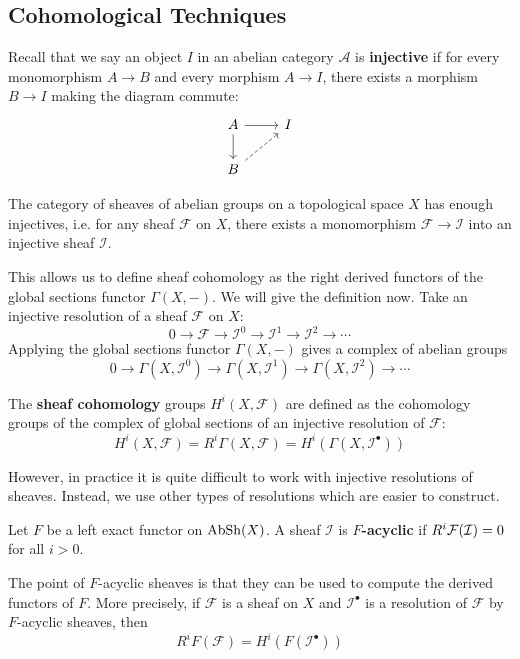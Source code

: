 \documentclass[12pt]{article}
\begin{document}
\subsection{Cohomological Techniques}
Recall that we say an object $I$ in an abelian category $\mathcal{A}$ is \textbf{injective} if for every monomorphism $A \to B$ and every morphism $A \to I$, there exists a morphism $B \to I$ making the diagram commute:
\[\begin{tikzcd}
        A \arrow[r] \arrow[d] & I \\
        B \arrow[ru, dashed] &
    \end{tikzcd}\]
\begin{theorem}
    The category of sheaves of abelian groups on a topological space $X$ has enough injectives, i.e. for any sheaf $\mathcal{F}$ on $X$, there exists a monomorphism $\mathcal{F} \to \mathcal{I}$ into an injective sheaf $\mathcal{I}$.
\end{theorem}

This allows us to define sheaf cohomology as the right derived functors of the global sections functor $\Gamma(X, -)$. We will give the definition now. Take an injective resolution of a sheaf $\mathcal{F}$ on $X$:
\[0 \to \mathcal{F} \to \mathcal{I}^0 \to \mathcal{I}^1 \to \mathcal{I}^2 \to \cdots\]
Applying the global sections functor $\Gamma(X, -)$ gives a complex of abelian groups
\[0 \to \Gamma(X, \mathcal{I}^0) \to \Gamma(X, \mathcal{I}^1) \to \Gamma(X, \mathcal{I}^2) \to \cdots\]

\begin{definition}
    The \textbf{sheaf cohomology} groups $H^i(X, \mathcal{F})$ are defined as the cohomology groups of the complex of global sections of an injective resolution of $\mathcal{F}$:
    \[H^i(X, \mathcal{F}) = R^i \Gamma(X, \mathcal{F}) = H^i(\Gamma(X, \mathcal{I}^\bullet))\]
\end{definition}

However, in practice it is quite difficult to work with injective resolutions of sheaves. Instead, we use other types of resolutions which are easier to construct.

\begin{definition}
    Let $F$ be a left exact functor on $\operatorname{AbSh}(X)$. A sheaf $\mathcal{I}$ is \textbf{$F$-acyclic} if $R^i {\mathcal{F}}(\mathcal{I}) = 0$ for all $i > 0$.
\end{definition}
The point of $F$-acyclic sheaves is that they can be used to compute the derived functors of $F$. More precisely, if $\mathcal{F}$ is a sheaf on $X$ and $\mathcal{I}^\bullet$ is a resolution of $\mathcal{F}$ by $F$-acyclic sheaves, then
\[R^i F(\mathcal{F}) = H^i(F(\mathcal{I}^\bullet))\]
\end{document}
